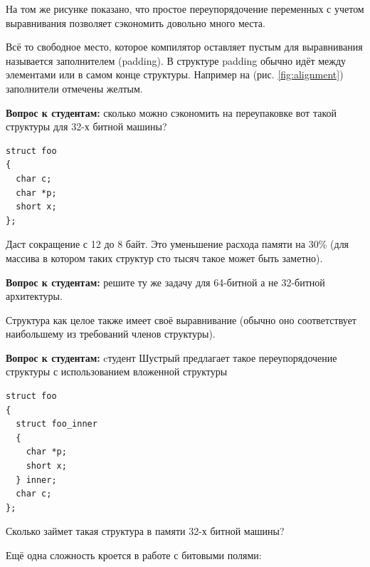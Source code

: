 \documentclass[a4paper,12pt,oneside]{article}
\newif\ifanswers
\begin{document}
На том же рисунке показано, что простое переупорядочение переменных с учетом выравнивания позволяет сэкономить довольно много места.

Всё то свободное место, которое компилятор оставляет пустым для выравнивания называется заполнителем (padding). В структуре padding обычно идёт между элементами или в самом конце структуры. Например на (рис. \ref{fig:alignment}) заполнители отмечены желтым.

\textbf{Вопрос к студентам:} сколько можно сэкономить на переупаковке вот такой структуры для 32-х битной машины?

\begin{lstlisting}
struct foo
{
  char c;
  char *p;
  short x;
};
\end{lstlisting}

\ifanswers
Правильный ответ: переупаковка в нисходящем порядке

\begin{lstlisting}
struct foo 
{
  char *p;
  short x;
  char c;
};
\end{lstlisting}
\fi

Даст сокращение с 12 до 8 байт. Это уменьшение расхода памяти на 30\% (для массива в котором таких структур сто тысяч такое может быть заметно).

\textbf{Вопрос к студентам:} решите ту же задачу для 64-битной а не 32-битной архитектуры.

\ifanswers
Правильный ответ: теперь указатель будет 8 байт и скоращение с 24 до 16 -- те же 30\%
\fi

Структура как целое также имеет своё выравнивание (обычно оно соответствует наибольшему из требований членов структуры).

\textbf{Вопрос к студентам:} cтудент Шустрый предлагает такое переупорядочение структуры с использованием вложенной структуры

\begin{lstlisting}
struct foo 
{
  struct foo_inner 
  {
    char *p;
    short x;
  } inner;
  char c;
};
\end{lstlisting}

Сколько займет такая структура в памяти 32-х битной машины?

\ifanswers
Ответ: выравнивание внутренней структуры получается 2, а выравнивание внешней структуры 7. Несложный подсчет показывает, что используется целых 16 байт. Немыслимо много. Поэтому с вложенными структурами надо быть осторожней.
\fi

Ещё одна сложность кроется в работе с битовыми полями:
\end{document}
